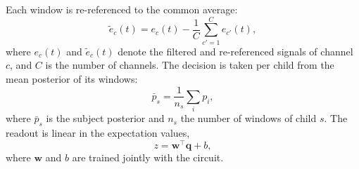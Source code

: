 Each window is re-referenced to the common average:
\begin{equation}
\tilde{e}_{c}(t) = e_{c}(t) - \frac{1}{C}\sum_{c'=1}^{C} e_{c'}(t),
\label{eq:car}
\end{equation}
where $e_{c}(t)$ and $\tilde{e}_{c}(t)$ denote the filtered and re-referenced signals of channel $c$, and $C$ is the number of channels.
The decision is taken per child from the mean posterior of its windows:
\begin{equation}
\bar{p}_{s} = \frac{1}{n_{s}} \sum_{i} p_{i},
\label{eq:subject}
\end{equation}
where $\bar{p}_{s}$ is the subject posterior and $n_{s}$ the number of windows of child $s$.
The readout is linear in the expectation values,
\begin{equation}
z = \mathbf{w}^{\top}\mathbf{q} + b,
\label{eq:readout}
\end{equation}
where $\mathbf{w}$ and $b$ are trained jointly with the circuit.

